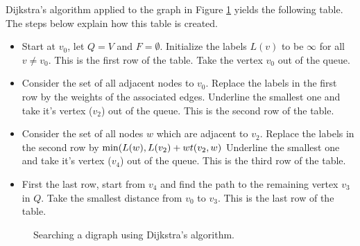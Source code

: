 \begin{example}
{\rm
Dijkstra's algorithm applied to the graph in Figure
\ref{fig:graph_algorithms:Dijkstra_algorithm_digraph} yields the following
table. The steps below explain how this table is created.

\begin{itemize}
\item
Start at $v_0$, let $Q=V$ and $F=\emptyset$.
Initialize the labels $L(v)$ to be $\infty$ for all
$v\not= v_0$. This is the first row of the table.
Take the vertex $v_0$ out of the queue.

\item
Consider the set of all adjacent nodes to $v_0$.
Replace the labels in the first row by the weights
of the associated edges.
Underline the smallest one and take it's vertex
($v_2$) out of the queue.
This is the second row of the table.

\item
Consider the set of all nodes $w$ which are adjacent 
to $v_2$. Replace the labels in the second row by 
${\rm min}(L(w),L(v_2)+wt(v_2,w)$
Underline the smallest one and take it's vertex
($v_4$) out of the queue.
This is the third row of the table.

\item
First the last row, start from $v_4$ and find 
the path to the remaining vertex $v_3$ in $Q$.
Take the smallest distance from $v_0$ to $v_3$.
This is the last row of the table.

\end{itemize}




\begin{figure}[!htbp]
\centering
{}
\caption{Searching a digraph using Dijkstra's algorithm.}
\label{fig:graph_algorithms:Dijkstra_algorithm_digraph}
\end{figure}


}
\end{example}
